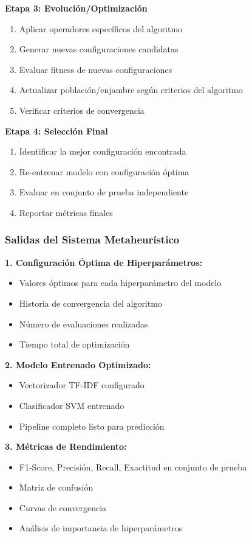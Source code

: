 \textbf{Etapa 3: Evolución/Optimización}
\begin{enumerate}
    \item Aplicar operadores específicos del algoritmo
    \item Generar nuevas configuraciones candidatas
    \item Evaluar fitness de nuevas configuraciones
    \item Actualizar población/enjambre según criterios del algoritmo
    \item Verificar criterios de convergencia
\end{enumerate}

\textbf{Etapa 4: Selección Final}
\begin{enumerate}
    \item Identificar la mejor configuración encontrada
    \item Re-entrenar modelo con configuración óptima
    \item Evaluar en conjunto de prueba independiente
    \item Reportar métricas finales
\end{enumerate}

\subsubsection{Salidas del Sistema Metaheurístico}

\textbf{1. Configuración Óptima de Hiperparámetros:}
\begin{itemize}
    \item Valores óptimos para cada hiperparámetro del modelo
    \item Historia de convergencia del algoritmo
    \item Número de evaluaciones realizadas
    \item Tiempo total de optimización
\end{itemize}

\textbf{2. Modelo Entrenado Optimizado:}
\begin{itemize}
    \item Vectorizador TF-IDF configurado
    \item Clasificador SVM entrenado
    \item Pipeline completo listo para predicción
\end{itemize}

\textbf{3. Métricas de Rendimiento:}
\begin{itemize}
    \item F1-Score, Precisión, Recall, Exactitud en conjunto de prueba
    \item Matriz de confusión
    \item Curvas de convergencia
    \item Análisis de importancia de hiperparámetros
\end{itemize}


